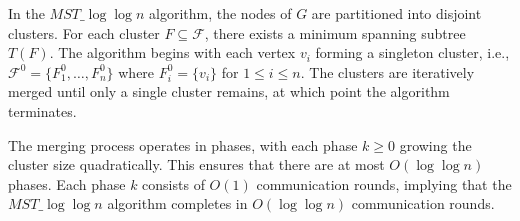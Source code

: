 \documentclass[english, 12pt, a4paper, elec, utf8, a-2b, online]{aaltothesis}
\newcommand{\mstalgo}{$MST\_\log\log{n}$}
\begin{document}
In the \mstalgo{} algorithm, the nodes of \( G \) are partitioned into disjoint clusters. For each cluster \( F \subseteq \mathcal{F} \), there exists a minimum spanning subtree \( T(F) \). The algorithm begins with each vertex \( v_i \) forming a singleton cluster, i.e., \( \mathcal{F}^0 = \{ F_1^0, \dots, F_n^0 \} \) where \( F_i^0 = \{ v_i \} \) for \( 1 \leq i \leq n \). The clusters are iteratively merged until only a single cluster remains, at which point the algorithm terminates.

The merging process operates in phases, with each phase \( k \geq 0 \) growing the cluster size quadratically. This ensures that there are at most \( O(\log \log n) \) phases. Each phase \( k \) consists of \( O(1) \) communication rounds, implying that the \mstalgo{} algorithm completes in \( O(\log \log n) \) communication rounds.
\end{document}
